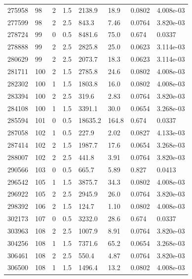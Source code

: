 \documentclass[preview]{standalone}
\begin{document}
{{{{\begin{tabular}{L{1.2cm}C{1.2cm} C{0.3cm}C{0.5cm} C{1.4cm}C{1.4cm} C{1.4cm}C{1.4cm}}
  275958  &    98  & 2     & 1.5 &  2138.9  & 18.9  & 0.0802 &  4.008e-03   \\ 
  277599  &    98  & 2     & 2.5 &  843.3  & 7.46  & 0.0764 &  3.820e-03   \\ 
  278724  &    99  & 0     & 0.5 &  8481.6  & 75.0  & 0.674 &  0.0337   \\ 
  278888  &    99  & 2     & 2.5 &  2825.8  & 25.0  & 0.0623 &  3.114e-03   \\ 
  280629  &    99  & 2     & 2.5 &  2073.7  & 18.3  & 0.0623 &  3.114e-03   \\ 
  281711  &   100  & 2     & 1.5 &  2785.8  & 24.6  & 0.0802 &  4.008e-03   \\ 
  282302  &   100  & 1     & 1.5 &  1803.8  & 16.0  & 0.0802 &  4.008e-03   \\ 
  283394  &   100  & 2     & 2.5 &  319.6  & 2.83  & 0.0764 &  3.820e-03   \\ 
  284108  &   100  & 1     & 1.5 &  3391.1  & 30.0  & 0.0654 &  3.268e-03   \\ 
  285594  &   101  & 0     & 0.5 &  18635.2  & 164.8  & 0.674 &  0.0337   \\ 
  287058  &   102  & 1     & 0.5 &  227.9  & 2.02  & 0.0827 &  4.133e-03   \\ 
  287414  &   102  & 2     & 1.5 &  1987.7  & 17.6  & 0.0654 &  3.268e-03   \\ 
  288007  &   102  & 2     & 2.5 &  441.8  & 3.91  & 0.0764 &  3.820e-03   \\ 
  290566  &   103  & 0     & 0.5 &  665.7  & 5.89  & 0.827 &  0.0413   \\ 
  296542  &   105  & 1     & 1.5 &  3875.7  & 34.3  & 0.0802 &  4.008e-03   \\ 
  296922  &   105  & 2     & 2.5 &  2945.9  & 26.0  & 0.0764 &  3.820e-03   \\ 
  298392  &   106  & 2     & 1.5 &  124.7  & 1.10  & 0.0802 &  4.008e-03   \\ 
  302173  &   107  & 0     & 0.5 &  3232.0  & 28.6  & 0.674 &  0.0337   \\ 
  303963  &   108  & 2     & 2.5 &  1007.9  & 8.91  & 0.0764 &  3.820e-03   \\ 
  304256  &   108  & 1     & 1.5 &  7371.6  & 65.2  & 0.0654 &  3.268e-03   \\ 
  306461  &   108  & 2     & 2.5 &  550.4  & 4.87  & 0.0764 &  3.820e-03   \\ 
  306500  &   108  & 1     & 1.5 &  1496.4  & 13.2  & 0.0802 &  4.008e-03   \\ 

\end{tabular}}}}}
\end{document}
